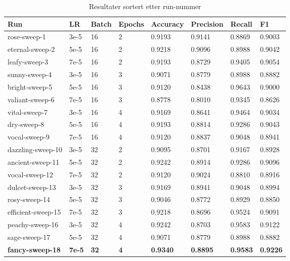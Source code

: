 \begin{table}
\caption{Resultater sortert etter run-nummer}
\label{tab:results}
\begin{tabular}{llllllll}
\toprule
Run & LR & Batch & Epochs & Accuracy & Precision & Recall & F1 \\
\midrule
rose-sweep-1 & 3e-5 & 16 & 2 & 0.9193 & 0.9141 & 0.8869 & 0.9003 \\
eternal-sweep-2 & 5e-5 & 16 & 2 & 0.9218 & 0.9096 & 0.8988 & 0.9042 \\
leafy-sweep-3 & 7e-5 & 16 & 2 & 0.9193 & 0.8729 & 0.9405 & 0.9054 \\
sunny-sweep-4 & 3e-5 & 16 & 3 & 0.9071 & 0.8779 & 0.8988 & 0.8882 \\
bright-sweep-5 & 5e-5 & 16 & 3 & 0.9120 & 0.8438 & 0.9643 & 0.9000 \\
valiant-sweep-6 & 7e-5 & 16 & 3 & 0.8778 & 0.8010 & 0.9345 & 0.8626 \\
vital-sweep-7 & 3e-5 & 16 & 4 & 0.9169 & 0.8641 & 0.9464 & 0.9034 \\
dry-sweep-8 & 5e-5 & 16 & 4 & 0.9193 & 0.8814 & 0.9286 & 0.9043 \\
vocal-sweep-9 & 7e-5 & 16 & 4 & 0.9120 & 0.8837 & 0.9048 & 0.8941 \\
dazzling-sweep-10 & 3e-5 & 32 & 2 & 0.9095 & 0.8701 & 0.9167 & 0.8928 \\
ancient-sweep-11 & 5e-5 & 32 & 2 & 0.9242 & 0.8914 & 0.9286 & 0.9096 \\
vocal-sweep-12 & 7e-5 & 32 & 2 & 0.9120 & 0.9024 & 0.8810 & 0.8916 \\
dulcet-sweep-13 & 3e-5 & 32 & 3 & 0.9169 & 0.8941 & 0.9048 & 0.8994 \\
rosy-sweep-14 & 5e-5 & 32 & 3 & 0.9046 & 0.8772 & 0.8929 & 0.8850 \\
efficient-sweep-15 & 7e-5 & 32 & 3 & 0.9218 & 0.8696 & 0.9524 & 0.9091 \\
peachy-sweep-16 & 3e-5 & 32 & 4 & 0.9242 & 0.8703 & 0.9583 & 0.9122 \\
sage-sweep-17 & 5e-5 & 32 & 4 & 0.9071 & 0.8779 & 0.8988 & 0.8882 \\
\textbf{fancy-sweep-18} & \textbf{7e-5} & \textbf{32} & \textbf{4} & \textbf{0.9340} & \textbf{0.8895} & \textbf{0.9583} & \textbf{0.9226} \\
\bottomrule
\end{tabular}
\end{table}

